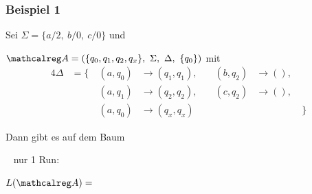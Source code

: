     \begin{frame}
      \frametitle{Beispiel 1}

      \begin{Itemize}
        \item
          Sei $\Sigma = \{a/2,~ b/0,~ c/0\}$ und

          \begin{minipage}{\linewidth}
            \begin{exampleblock}{}
              $\Aut{A} = (\{q_0,q_1,q_2,q_x\},~ \Sigma,~ \Delta,~ \{q_0\})$ mit
              \begin{alignat*}{4}
                \Delta & = \{   ~& (a,q_0) & \to (q_1,q_1), & \quad (b,q_2) & \to (), & \\
                       &         & (a,q_1) & \to (q_2,q_2), & \quad (c,q_2) & \to (), & \\
                       &         & (a,q_0) & \to (q_x,q_x)  &               &         &~\}
              \end{alignat*}
            \end{exampleblock}
          \end{minipage}


          \par\smallskip
        \item<2->
          Dann gibt es auf dem Baum
          \begin{center}
            \begin{minipage}{.21\textwidth}
            \end{minipage}
            ~
            nur 1 Run:
            ~
          \end{center}
          \par\bigskip
        \item<5->
          $L(\Aut{A}) =$
      \end{Itemize}

    \end{frame}

